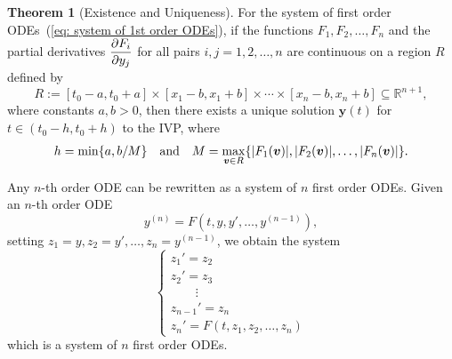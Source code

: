 \documentclass[10pt,UTF8]{article}
\renewcommand{\vec}[1]{\bm{#1}}
\newenvironment{theoremBox}
{
  \begin{tcolorbox}[colback=yellow!5!white,colframe=yellow!75!black,parbox=false,before
  upper=\par,before lower=\par]}
  {
\end{tcolorbox}}
\theoremstyle{definition}
\newtheorem{definition inner}{Definition}[section]
\theoremstyle{definition}
\newtheorem{theorem inner}{Theorem}[section]
\newenvironment{theorem}[1][]
{
  \begin{theoremBox}
  \begin{theorem inner}[#1]\hfill\par}
    {
    \end{theorem inner}
\end{theoremBox}}
\theoremstyle{definition}
\newtheorem*{proof inner}{\textit{Proof}}
\theoremstyle{plain}
\newtheorem{tip inner}{Tip}[section]
\theoremstyle{remark}
\begin{document}
\begin{theorem}[Existence and Uniqueness]
  {}\label{thm: Existence and Uniqueness for 1st order ODE Systems}
  For the system of first order ODEs~(\ref{eq: system of 1st order ODEs}),
  if the functions \(F_1, F_2, \ldots, F_n\) and the partial derivatives
  \(\displaystyle\pdv{F_i}{y_j}\) for all pairs \(i, j = 1, 2, \ldots, n\)
  are continuous on a region \(R\) defined by
  \begin{equation*}
    R := [t_0 - a, t_0 + a] \times [x_1 - b, x_1 + b] \times \cdots
    \times [x_n - b, x_n + b] \subseteq \mathbb{R}^{n+1},
  \end{equation*}
  where constants \(a, b > 0\), then there exists a unique solution
  \(\vec{y}(t)\) for \(t \in (t_0 - h, t_0 + h)\) to the IVP,
  where
  \begin{equation*}
    h = \min \{a, b/M\} \qand
    M = \max\limits_{\vec{v} \in R}\{
      \abs{F_1(\vec{v})}, \abs{F_2(\vec{v})}, \ldots, \abs{F_n(\vec{v})}
    \}.
  \end{equation*}
\end{theorem}

Any \(n\)-th order ODE can be rewritten as a system of \(n\) first order ODEs.
Given an \(n\)-th order ODE
\begin{equation*}
  y^{(n)} = F(t, y, y', \ldots, y^{(n-1)}),
\end{equation*}
setting \(z_1 = y, z_2 = y', \ldots, z_n = y^{(n-1)}\), we obtain the system
\begin{equation*}
  \begin{cases}
    z_1' = z_2 \\
    z_2' = z_3 \\
    \qquad\vdots \\
    z_{n-1}' = z_n \\
    z_n' = F(t, z_1, z_2, \ldots, z_n)
  \end{cases}
\end{equation*}
which is a system of \(n\) first order ODEs.
\end{document}
